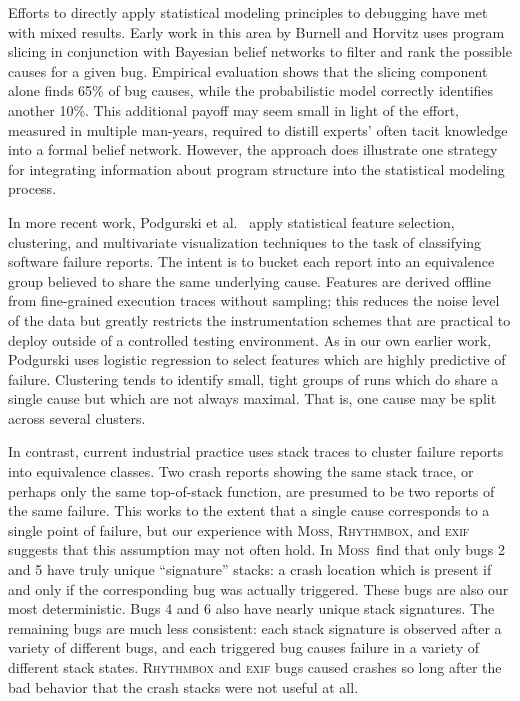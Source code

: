 \documentclass[draft]{sig-alternate}
\newcommand{\moss}{\textsc{Moss}\xspace}
\newcommand{\rhythmbox}{\textsc{Rhythmbox}\xspace}
\newcommand{\exif}{\textsc{exif}\xspace}
\begin{document}
Efforts to directly apply statistical modeling principles to debugging
have met with mixed results.  Early work in this area by Burnell and
Horvitz \cite{Burnell:1995:SCM} uses program slicing in conjunction
with Bayesian belief networks to filter and rank the possible causes
for a given bug.  Empirical evaluation shows that the slicing component
alone finds 65\% of bug causes, while the probabilistic model
correctly identifies another 10\%.  This additional payoff may seem
small in light of the effort, measured in multiple
man-years, required to distill experts' often tacit knowledge into a
formal belief network.  However, the approach does illustrate one
strategy for integrating information about program structure into the
statistical modeling process.

In more recent work, Podgurski et al.\ \cite{ICSE`03*465} apply
statistical feature selection, clustering, and multivariate
visualization techniques to the task of classifying software failure
reports.  The intent is to bucket each report into an equivalence
group believed to share the same underlying cause.  Features are
derived offline from fine-grained execution traces without sampling;
this reduces the noise level of the data but greatly restricts the
instrumentation schemes that are practical to deploy outside of a
controlled testing environment.  As in our own earlier work, Podgurski
uses logistic regression to select features which are highly
predictive of failure.  
Clustering tends to identify small, tight groups of runs which do
share a single cause but which are not always maximal.  That is, one
cause may be split across several clusters.

In contrast, current
industrial practice uses stack traces to cluster failure reports into
equivalence classes.  Two crash reports showing the same stack trace,
or perhaps only the same top-of-stack function, are presumed to be two
reports of the same failure.  This works to the extent that a single
cause corresponds to a single point of failure, but our experience
with \moss, \rhythmbox, and \exif suggests that this assumption may not often hold.  In \moss\ find
that only bugs 2 and 5 have truly unique ``signature'' stacks: a
crash location which is present if and only if the corresponding bug
was actually triggered.  These bugs are also our most deterministic.
Bugs 4 and 6 also have nearly unique stack signatures.
The remaining bugs are much less consistent: each stack signature is
observed after a variety of different bugs, and each triggered bug
causes failure in a variety of different stack states.  \rhythmbox and \exif
bugs caused crashes so long after the bad behavior that the crash stacks
were not useful at all.
\end{document}
